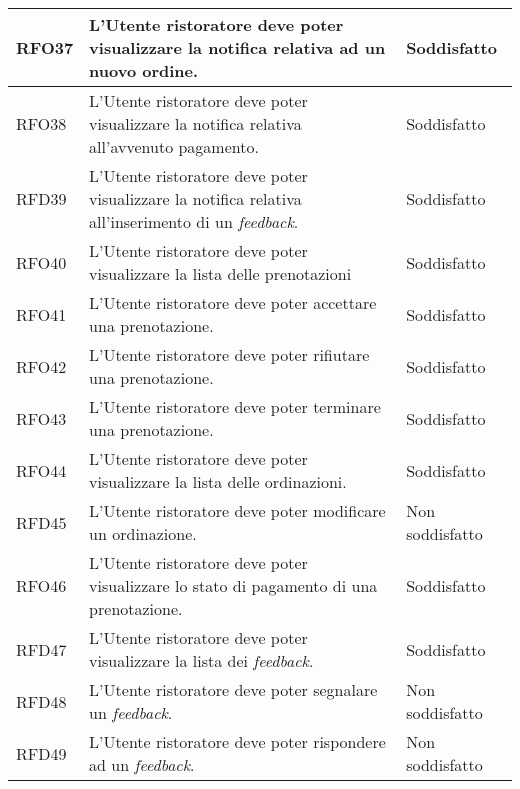 \begin{longtable}{|l|p{}|p{3cm}|}
	\hline
	RFO37       & L'Utente ristoratore deve poter visualizzare la notifica relativa ad un nuovo ordine.                                        & Soddisfatto     \\
	\hline
	RFO38       & L'Utente ristoratore deve poter visualizzare la notifica relativa all'avvenuto pagamento.                                    & Soddisfatto     \\
	\hline
	RFD39       & L'Utente ristoratore deve poter visualizzare la notifica relativa all'inserimento di un \textit{feedback}.                   & Soddisfatto     \\
	\hline
	RFO40       & L'Utente ristoratore deve poter visualizzare la lista delle prenotazioni                                                     & Soddisfatto     \\
	\hline
	RFO41       & L'Utente ristoratore deve poter accettare una prenotazione.                                                                  & Soddisfatto     \\
	\hline
	RFO42       & L'Utente ristoratore deve poter rifiutare una prenotazione.                                                                  & Soddisfatto     \\
	\hline
	RFO43       & L'Utente ristoratore deve poter terminare una prenotazione.                                                                  & Soddisfatto     \\
	\hline
	RFO44       & L'Utente ristoratore deve poter visualizzare la lista delle ordinazioni.                                                     & Soddisfatto     \\
	\hline
	RFD45       & L'Utente ristoratore deve poter modificare un ordinazione.                                                                   & Non soddisfatto \\
	\hline
	RFO46       & L'Utente ristoratore deve poter visualizzare lo stato di pagamento di una prenotazione.                                      & Soddisfatto     \\
	\hline
	RFD47       & L'Utente ristoratore deve poter visualizzare la lista dei \textit{feedback}.                                                 & Soddisfatto     \\
	\hline
	RFD48       & L'Utente ristoratore deve poter segnalare un \textit{feedback}.                                                              & Non soddisfatto \\
	\hline
	RFD49       & L'Utente ristoratore deve poter rispondere ad un \textit{feedback}.                                                          & Non soddisfatto \\

\end{longtable}
